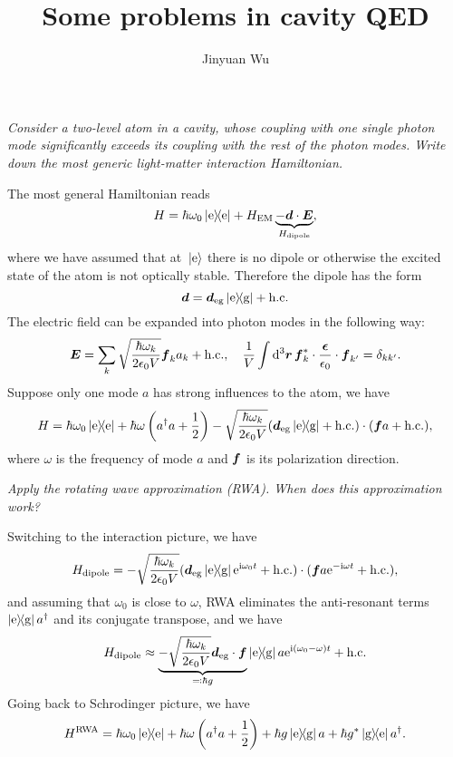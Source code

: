 \documentclass[hyperref, a4paper]{article}
\title{Some problems in cavity QED}
\author{Jinyuan Wu}
\newcommand*{\ii}{\mathrm{i}}
\newcommand*{\ee}{\mathrm{e}}
\newcommand*{\kete}{\ket*{\text{e}}}
\newcommand*{\dyade}{\dyad{\text{e}}}
\newcommand*{\dyadeg}{\dyad{\text{e}}{\text{g}}}
\newcommand*{\dyadge}{\dyad{\text{g}}{\text{e}}}
\newcommand*{\dieg}{\vb*{d}_{\text{eg}}}
\begin{document}
\maketitle

\textit{Consider a two-level atom in a cavity, 
whose coupling with one single photon mode significantly exceeds its coupling with the rest of the photon modes.
Write down the most generic light-matter interaction Hamiltonian.}

The most general Hamiltonian reads 
\begin{equation}
    H = \hbar \omega_0 \dyade + H_{\text{EM}} \underbrace{- \vb*{d} \cdot \vb*{E}}_{H_{\text{dipole}}},
    \label{eq:whole-ham}
\end{equation} 
where we have assumed that at $\kete$ there is no dipole 
or otherwise the excited state of the atom is not optically stable.
Therefore the dipole has the form 
\begin{equation}
    \vb*{d} = \dieg \dyadeg + \text{h.c.}
\end{equation}
The electric field can be expanded into photon modes in the following way:
\begin{equation}
    \vb*{E} = \sum_k \sqrt{\frac{\hbar \omega_k}{2 \epsilon_0 V}} \vb*{f}_k a_k + \text{h.c.}, \quad 
    \frac{1}{V} \int \dd[3]{\vb*{r}} \vb*{f}_k^* \cdot \frac{\vb*{\epsilon}}{\epsilon_0} \cdot \vb*{f}_{k'} = \delta_{kk'}.
\end{equation}
Suppose only one mode $a$ has strong influences to the atom, we have 
\begin{equation}
    H = \hbar \omega_0 \dyade + \hbar \omega \left( a^\dag a + \frac{1}{2} \right) 
    - \sqrt{\frac{\hbar \omega_k}{2 \epsilon_0 V}} (\dieg \dyadeg + \text{h.c.}) \cdot (\vb*{f} a + \text{h.c.}) ,
\end{equation}
where $\omega$ is the frequency of mode $a$ and $\vb*{f}$ is its polarization direction.

\textit{Apply the rotating wave approximation (RWA). 
When does this approximation work?}

Switching to the interaction picture, we have 
\begin{equation}
    H_{\text{dipole}} = - \sqrt{\frac{\hbar \omega_k}{2 \epsilon_0 V}} 
    (\dieg \dyadeg \ee^{\ii \omega_0 t} + \text{h.c.}) \cdot (\vb*{f} a \ee^{- \ii \omega t} + \text{h.c.}) ,
\end{equation}
and assuming that $\omega_0$ is close to $\omega$, RWA eliminates the anti-resonant terms 
$\dyadeg a^\dag$ and its conjugate transpose, and we have 
\begin{equation}
    H_{\text{dipole}} \approx \underbrace{- \sqrt{\frac{\hbar \omega_k}{2 \epsilon_0 V}} \dieg \cdot \vb*{f} }_{\eqqcolon \hbar g}
    \dyadeg a \ee^{\ii (\omega_0 - \omega) t} + \text{h.c.}
\end{equation}
Going back to Schrodinger picture, we have 
\begin{equation}
    H^{\text{RWA}} = \hbar \omega_0 \dyade + \hbar \omega \left( a^\dag a + \frac{1}{2} \right) + \hbar g \dyadeg a + \hbar g^* \dyadge a^\dag. 
\end{equation}
\end{document}
